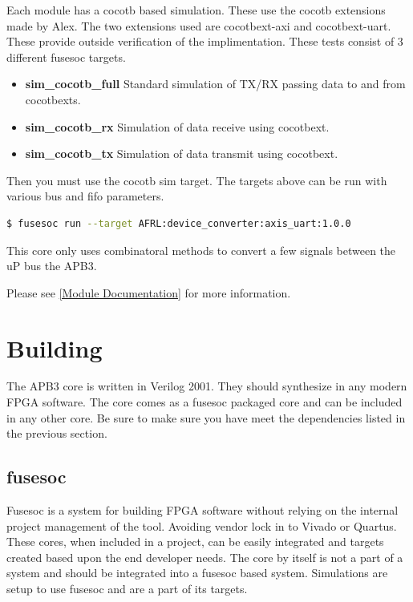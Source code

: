 Each module has a cocotb based simulation. These use the cocotb extensions made by Alex.
The two extensions used are cocotbext-axi and cocotbext-uart. These provide outside verification
of the implimentation. These tests consist of 3 different fusesoc targets.

\begin{itemize}
  \item \textbf{sim\_cocotb\_full} Standard simulation of TX/RX passing data to and from cocotbexts.
  \item \textbf{sim\_cocotb\_rx} Simulation of data receive using cocotbext.
  \item \textbf{sim\_cocotb\_tx} Simulation of data transmit using cocotbext.
\end{itemize}

Then you must use the cocotb sim target. The targets above can be run with various bus and fifo parameters.
\begin{lstlisting}[language=bash]
  $ fusesoc run --target AFRL:device_converter:axis_uart:1.0.0
\end{lstlisting}
This core only uses combinatoral methods to convert a few signals between the uP bus the APB3.

Please see \ref{Module Documentation} for more information.

\section{Building}

\par
The APB3 core is written in Verilog 2001. They should synthesize in any modern FPGA software. The core comes as a fusesoc packaged core and can be
included in any other core. Be sure to make sure you have meet the dependencies listed in the previous section.

\subsection{fusesoc}
\par
Fusesoc is a system for building FPGA software without relying on the internal project management of the tool. Avoiding vendor lock in to Vivado or Quartus.
These cores, when included in a project, can be easily integrated and targets created based upon the end developer needs. The core by itself is not a part of
a system and should be integrated into a fusesoc based system. Simulations are setup to use fusesoc and are a part of its targets.


